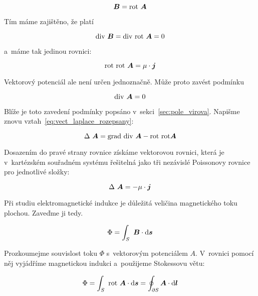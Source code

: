 \begin{equation}
\boldsymbol{B} = \mathrm{rot} \ \boldsymbol{A}
\end{equation}

Tím máme zajištěno, že platí

\begin{equation}
\diverg \ \vect{B} = \diverg \ \rot \ \vect{A} = 0
\end{equation}

a~máme tak jedinou rovnici:

\begin{equation}
\mathrm{rot} \ \mathrm{rot} \ \boldsymbol{A} = \mu \cdot \boldsymbol{j}
\end{equation}

Vektorový potenciál ale není určen jednoznačně. Může proto zavést podmínku 

\begin{equation}
\mathrm{div} \ \boldsymbol{A} = 0
\end{equation}

Blíže je toto zavedení podmínky popsáno v~sekci~\ref{sec:pole_virova}. Napišme znovu vztah~\eqref{eq:vect_laplace_rozepsany}:

\begin{equation}
\Delta \ \vect{A} = \grad \ \diverg \ \vect{A} - \rot \ \rot \vect{A} 
\end{equation}

Dosazením do pravé strany rovnice získáme vektorovou rovnici, která je v~kartézském souřadném systému řešitelná jako tři nezávislé Poissonovy rovnice pro jednotlivé složky:

\begin{equation}
\Delta \ \boldsymbol{A} = -\mu \cdot \boldsymbol{j}
\end{equation}

Při studiu elektromagnetické indukce je důležitá veličina magnetického toku plochou. Zaveďme ji tedy.

\begin{equation}
\Phi = \int_S \ \boldsymbol{B} \cdot \mathrm{d}\boldsymbol{s}
\end{equation}

Prozkoumejme souvislost toku \(\Phi\) s~vektorovým potenciálem \(A\). V~rovnici pomocí něj vyjádříme magnetickou indukci a~použijeme Stokessovu větu:

\begin{equation}
\Phi = \int_S \ \mathrm{rot} \ \boldsymbol{A} \cdot \mathrm{d}\boldsymbol{s} = \oint_{\partial S} \boldsymbol{A} \cdot \mathrm{d}\boldsymbol{l}
\end{equation}

